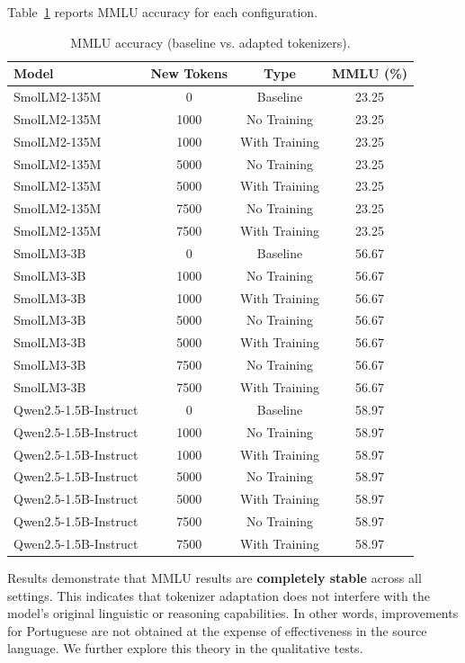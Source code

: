 Table~\ref{tab:mmlu-results} reports MMLU accuracy for each configuration.

\begin{table}[h]
\centering
\begin{tabular}{lccc}
\hline
\textbf{Model} & \textbf{New Tokens} & \textbf{Type} & \textbf{MMLU (\%)} \\
\hline
SmolLM2-135M   & 0     & Baseline      & 23.25 \\
SmolLM2-135M   & 1000  & No Training   & 23.25 \\
SmolLM2-135M   & 1000  & With Training & 23.25 \\
SmolLM2-135M   & 5000  & No Training   & 23.25 \\
SmolLM2-135M   & 5000  & With Training & 23.25 \\
SmolLM2-135M   & 7500  & No Training   & 23.25 \\
SmolLM2-135M   & 7500  & With Training & 23.25 \\
\hline
SmolLM3-3B     & 0     & Baseline      & 56.67 \\
SmolLM3-3B     & 1000  & No Training   & 56.67 \\
SmolLM3-3B     & 1000  & With Training & 56.67 \\
SmolLM3-3B     & 5000  & No Training   & 56.67 \\
SmolLM3-3B     & 5000  & With Training & 56.67 \\
SmolLM3-3B     & 7500  & No Training   & 56.67 \\
SmolLM3-3B     & 7500  & With Training & 56.67 \\
\hline
Qwen2.5-1.5B-Instruct   & 0     & Baseline      & 58.97 \\
Qwen2.5-1.5B-Instruct   & 1000  & No Training   & 58.97 \\
Qwen2.5-1.5B-Instruct   & 1000  & With Training & 58.97 \\
Qwen2.5-1.5B-Instruct   & 5000  & No Training   & 58.97 \\
Qwen2.5-1.5B-Instruct   & 5000  & With Training & 58.97 \\
Qwen2.5-1.5B-Instruct   & 7500  & No Training   & 58.97 \\
Qwen2.5-1.5B-Instruct   & 7500  & With Training & 58.97 \\
\hline
\end{tabular}
\caption{MMLU accuracy (baseline vs. adapted tokenizers).}
\label{tab:mmlu-results}
\end{table}
\newpage
Results demonstrate that MMLU results are \textbf{completely stable} across all settings. This indicates that tokenizer adaptation does not interfere with the model’s original linguistic or reasoning capabilities. In other words, improvements for Portuguese are not obtained at the expense of effectiveness in the source language.
We further explore this theory in the qualitative tests.




